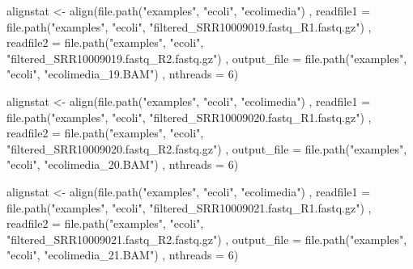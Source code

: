 \documentclass[
]{book}
\newenvironment{Shaded}{\begin{snugshade}}{\end{snugshade}}
\newcommand{\AttributeTok}[1]{\textcolor[rgb]{0.77,0.63,0.00}{#1}}
\newcommand{\DecValTok}[1]{\textcolor[rgb]{0.00,0.00,0.81}{#1}}
\newcommand{\FunctionTok}[1]{\textcolor[rgb]{0.00,0.00,0.00}{#1}}
\newcommand{\NormalTok}[1]{#1}
\newcommand{\OtherTok}[1]{\textcolor[rgb]{0.56,0.35,0.01}{#1}}
\newcommand{\StringTok}[1]{\textcolor[rgb]{0.31,0.60,0.02}{#1}}
\begin{document}
\begin{Shaded}
\begin{Highlighting}[]

\NormalTok{alignstat }\OtherTok{\textless{}{-}} \FunctionTok{align}\NormalTok{(}\FunctionTok{file.path}\NormalTok{(}\StringTok{"examples"}\NormalTok{, }\StringTok{"ecoli"}\NormalTok{, }\StringTok{"ecolimedia"}\NormalTok{)}
\NormalTok{                   , }\AttributeTok{readfile1 =} \FunctionTok{file.path}\NormalTok{(}\StringTok{"examples"}\NormalTok{, }\StringTok{"ecoli"}\NormalTok{, }\StringTok{"filtered\_SRR10009019.fastq\_R1.fastq.gz"}\NormalTok{)}
\NormalTok{                   , }\AttributeTok{readfile2 =} \FunctionTok{file.path}\NormalTok{(}\StringTok{"examples"}\NormalTok{, }\StringTok{"ecoli"}\NormalTok{, }\StringTok{"filtered\_SRR10009019.fastq\_R2.fastq.gz"}\NormalTok{)}
\NormalTok{                   , }\AttributeTok{output\_file =} \FunctionTok{file.path}\NormalTok{(}\StringTok{"examples"}\NormalTok{, }\StringTok{"ecoli"}\NormalTok{, }\StringTok{"ecolimedia\_19.BAM"}\NormalTok{)}
\NormalTok{                   , }\AttributeTok{nthreads =} \DecValTok{6}\NormalTok{)}



\NormalTok{alignstat }\OtherTok{\textless{}{-}} \FunctionTok{align}\NormalTok{(}\FunctionTok{file.path}\NormalTok{(}\StringTok{"examples"}\NormalTok{, }\StringTok{"ecoli"}\NormalTok{, }\StringTok{"ecolimedia"}\NormalTok{)}
\NormalTok{                   , }\AttributeTok{readfile1 =} \FunctionTok{file.path}\NormalTok{(}\StringTok{"examples"}\NormalTok{, }\StringTok{"ecoli"}\NormalTok{, }\StringTok{"filtered\_SRR10009020.fastq\_R1.fastq.gz"}\NormalTok{)}
\NormalTok{                   , }\AttributeTok{readfile2 =} \FunctionTok{file.path}\NormalTok{(}\StringTok{"examples"}\NormalTok{, }\StringTok{"ecoli"}\NormalTok{, }\StringTok{"filtered\_SRR10009020.fastq\_R2.fastq.gz"}\NormalTok{)}
\NormalTok{                   , }\AttributeTok{output\_file =} \FunctionTok{file.path}\NormalTok{(}\StringTok{"examples"}\NormalTok{, }\StringTok{"ecoli"}\NormalTok{, }\StringTok{"ecolimedia\_20.BAM"}\NormalTok{)}
\NormalTok{                   , }\AttributeTok{nthreads =} \DecValTok{6}\NormalTok{)}


\NormalTok{alignstat }\OtherTok{\textless{}{-}} \FunctionTok{align}\NormalTok{(}\FunctionTok{file.path}\NormalTok{(}\StringTok{"examples"}\NormalTok{, }\StringTok{"ecoli"}\NormalTok{, }\StringTok{"ecolimedia"}\NormalTok{)}
\NormalTok{                   , }\AttributeTok{readfile1 =} \FunctionTok{file.path}\NormalTok{(}\StringTok{"examples"}\NormalTok{, }\StringTok{"ecoli"}\NormalTok{, }\StringTok{"filtered\_SRR10009021.fastq\_R1.fastq.gz"}\NormalTok{)}
\NormalTok{                   , }\AttributeTok{readfile2 =} \FunctionTok{file.path}\NormalTok{(}\StringTok{"examples"}\NormalTok{, }\StringTok{"ecoli"}\NormalTok{, }\StringTok{"filtered\_SRR10009021.fastq\_R2.fastq.gz"}\NormalTok{)}
\NormalTok{                   , }\AttributeTok{output\_file =} \FunctionTok{file.path}\NormalTok{(}\StringTok{"examples"}\NormalTok{, }\StringTok{"ecoli"}\NormalTok{, }\StringTok{"ecolimedia\_21.BAM"}\NormalTok{)}
\NormalTok{                   , }\AttributeTok{nthreads =} \DecValTok{6}\NormalTok{)}



\end{Highlighting}
\end{Shaded}
\end{document}

